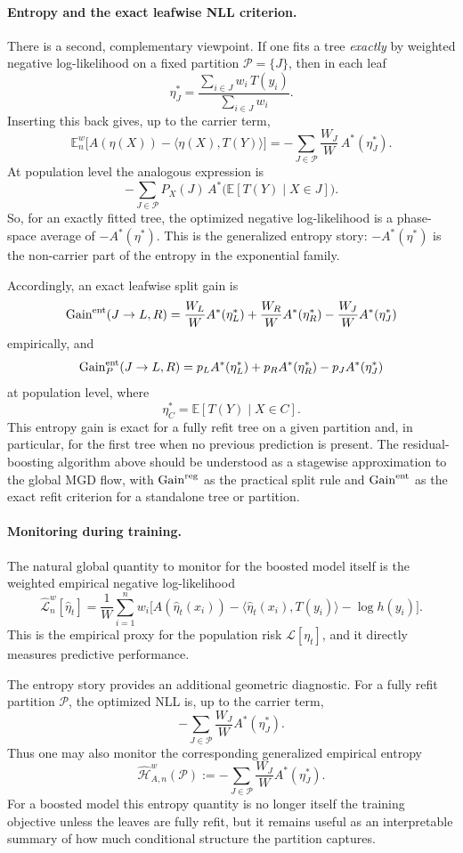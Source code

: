 \documentclass[11pt]{article}
\begin{document}
\paragraph{Entropy and the exact leafwise NLL criterion.}
There is a second, complementary viewpoint. If one fits a tree \emph{exactly} by weighted negative log-likelihood on a fixed partition \(\mathcal P=\{J\}\), then in each leaf
\[
\eta_J^\ast
=
\frac{\sum_{i\in J} w_i\,T(y_i)}{\sum_{i\in J} w_i}.
\]
Inserting this back gives, up to the carrier term,
\[
\mathbb E_n^w\!\big[A(\eta(X))-\langle \eta(X),T(Y)\rangle\big]
=
-\sum_{J\in\mathcal P}\frac{W_J}{W}\,A^\ast(\eta_J^\ast).
\]
At population level the analogous expression is
\[
-\sum_{J\in\mathcal P} P_X(J)\,A^\ast\!\big(\mathbb E[T(Y)\mid X\in J]\big).
\]
So, for an exactly fitted tree, the optimized negative log-likelihood is a phase-space average of \(-A^\ast(\eta^\ast)\). This is the generalized entropy story: \(-A^\ast(\eta^\ast)\) is the non-carrier part of the entropy in the exponential family.

Accordingly, an exact leafwise split gain is
\[
\mathrm{Gain}^{\rm ent}(J\to L,R)
=
\frac{W_L}{W}A^\ast(\eta_L^\ast)
+
\frac{W_R}{W}A^\ast(\eta_R^\ast)
-
\frac{W_J}{W}A^\ast(\eta_J^\ast)
\]
empirically, and
\[
\mathrm{Gain}^{\rm ent}_P(J\to L,R)
=
p_L A^\ast(\eta_L^\ast)
+
p_R A^\ast(\eta_R^\ast)
-
p_J A^\ast(\eta_J^\ast)
\]
at population level, where
\[
\eta_C^\ast=\mathbb E[T(Y)\mid X\in C].
\]
This entropy gain is exact for a fully refit tree on a given partition and, in particular, for the first tree when no previous prediction is present. The residual-boosting algorithm above should be understood as a stagewise approximation to the global MGD flow, with \(\mathrm{Gain}^{\rm reg}\) as the practical split rule and \(\mathrm{Gain}^{\rm ent}\) as the exact refit criterion for a standalone tree or partition.

\paragraph{Monitoring during training.}
The natural global quantity to monitor for the boosted model itself is the weighted empirical negative log-likelihood
\[
\widehat{\mathcal L}_n^w[\hat\eta_t]
=
\frac{1}{W}\sum_{i=1}^n
w_i\Big[A(\hat\eta_t(x_i))-\langle \hat\eta_t(x_i),T(y_i)\rangle-\log h(y_i)\Big].
\]
This is the empirical proxy for the population risk \(\mathcal L[\eta_t]\), and it directly measures predictive performance.

The entropy story provides an additional geometric diagnostic. For a fully refit partition \(\mathcal P\), the optimized NLL is, up to the carrier term,
\[
-\sum_{J\in\mathcal P}\frac{W_J}{W}A^\ast(\eta_J^\ast).
\]
Thus one may also monitor the corresponding generalized empirical entropy
\[
\widehat{\mathcal H}_{A,n}^w(\mathcal P)
:=
-\sum_{J\in\mathcal P}\frac{W_J}{W}A^\ast(\eta_J^\ast).
\]
For a boosted model this entropy quantity is no longer itself the training objective unless the leaves are fully refit, but it remains useful as an interpretable summary of how much conditional structure the partition captures.
\end{document}
